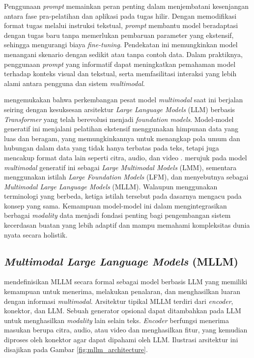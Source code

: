 Penggunaan \textit{prompt} memainkan peran penting dalam menjembatani kesenjangan antara fase pra-pelatihan dan aplikasi pada tugas hilir. Dengan memodifikasi format tugas melalui instruksi tekstual, \textit{prompt} membantu model beradaptasi dengan tugas baru tanpa memerlukan pembaruan parameter yang ekstensif, sehingga mengurangi biaya \textit{fine-tuning}. Pendekatan ini memungkinkan model menangani skenario dengan sedikit atau tanpa contoh data. Dalam praktiknya, penggunaan \textit{prompt} yang informatif dapat meningkatkan pemahaman model terhadap konteks visual dan tekstual, serta memfasilitasi interaksi yang lebih alami antara pengguna dan sistem \textit{multimodal}. 

\textcite{huyenAIEngineeringBuilding2025} mengemukakan bahwa perkembangan pesat model \textit{multimodal} saat ini berjalan seiring dengan kesuksesan arsitektur \textit{Large Language Models} (LLM) berbasis \textit{Transformer} yang telah berevolusi menjadi \textit{foundation models}. Model-model generatif ini menjalani pelatihan ekstensif menggunakan himpunan data yang luas dan beragam, yang memungkinkannya untuk menangkap pola umum dan hubungan dalam data yang tidak hanya terbatas pada teks, tetapi juga mencakup format data lain seperti citra, audio, dan video \parencite{altoBuildingLLMPowerd2024}. \textcite{huyenAIEngineeringBuilding2025} merujuk pada model \textit{multimodal} generatif ini sebagai \textit{Large Multimodal Models} (LMM), sementara \textcite{altoBuildingLLMPowerd2024} menggunakan istilah \textit{Large Foundation Models} (LFM), dan \textcite{yinSurveyMultimodalLarge2024} menyebutnya sebagai \textit{Multimodal Large Language Models} (MLLM). Walaupun menggunakan terminologi yang berbeda, ketiga istilah tersebut pada dasarnya mengacu pada konsep yang sama. Kemampuan model-model ini dalam mengintegrasikan berbagai \textit{modality} data menjadi fondasi penting bagi pengembangan sistem kecerdasan buatan yang lebih adaptif dan mampu memahami kompleksitas dunia nyata secara holistik.

\subsection{\textit{Multimodal Large Language Models} (MLLM)}
\textcite{yinSurveyMultimodalLarge2024} mendefinisikan MLLM secara formal sebagai model berbasis LLM yang memiliki kemampuan untuk menerima, melakukan penalaran, dan menghasilkan luaran dengan informasi \textit{multimodal}. Arsitektur tipikal MLLM terdiri dari \textit{encoder}, konektor, dan LLM. Sebuah generator opsional dapat ditambahkan pada LLM untuk menghasilkan \textit{modality} lain selain teks. \textit{Encoder} berfungsi menerima masukan berupa citra, audio, atau video dan menghasilkan fitur, yang kemudian diproses oleh konektor agar dapat dipahami oleh LLM. Ilustrasi arsitektur ini disajikan pada Gambar \ref{fig:mllm_architecture}.

